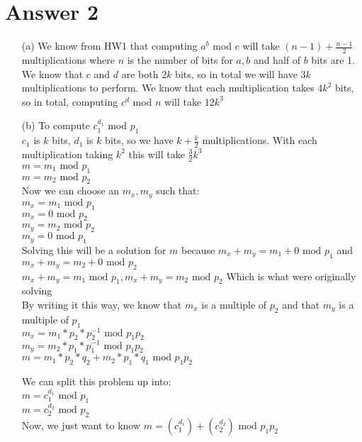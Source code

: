 \documentclass[11pt]{article}
\theoremstyle{definition}
\begin{document}
\section*{Answer 2}
\begin{enumerate}
\item[(a)]
We know from HW1 that computing $a^b$ mod $c$ will take $(n-1) + \frac{n-1}{2}$ multiplications  where $n$ is the number of bits for $a,b$ and half of $b$ bits are 1.  We know that $c$ and $d$ are both $2k$ bits, so in total we will have $3k$ multiplications to perform.  We know that each multiplication takes $4k^2$ bits, so in total, computing $c^d$ mod $n$ will take $12k^3$

\item[(b)]
To compute $c_1^{d_1}$ mod $p_1$\\
$c_1$ is $k$ bits, $d_1$ is $k$ bits, so we have $k + \frac{k}{2}$ multiplications.  With each multiplication taking $k^2$ this will take $\frac{3}{2}k^3$\\
\newline
$m = m_1 \text{ mod } p_1$\\
$m = m_2 \text{ mod } p_2$\\
Now we can choose an $m_x, m_y$ such that:\\
$m_x = m_1 \text{ mod } p_1$\\
$m_x = 0 \text{ mod } p_2$\\
$m_y = m_2 \text{ mod } p_2$\\
$m_y = 0 \text{ mod } p_1$\\
Solving this will be a solution for $m$ because $m_x + m_y = m_1 + 0 \text{ mod } p_1$ and $m_x + m_y = m_2 + 0 \text{ mod } p_2$\\
$m_x + m_y = m_1 \text{ mod } p_1, m_x + m_y = m_2 \text{ mod } p_2$ Which is what were originally solving\\
By writing it this way, we know that $m_x$ is a multiple of $p_2$ and that $m_y$ is a multiple of $p_1$\\
$m_x = m_1 * p_2 * p_2^{-1} \text{ mod } p_1p_2$\\
$m_y = m_2 * p_1 * p_1^{-1} \text{ mod } p_1p_2$\\
$m = m_1 * p_2 * q_2 + m_2 * p_1 * q_1 \text{ mod } p_1p_2$


We can split this problem up into:\\
$m = c_1^{d_1} \text{ mod } p_1$\\
$m = c_2^{d_2} \text{ mod } p_2$\\
Now, we just want to know $m = ( c_1^{d_1} ) + (c_2^{d_2}) \text{ mod } p_1p_2$\\



\end{enumerate}
\end{document}
